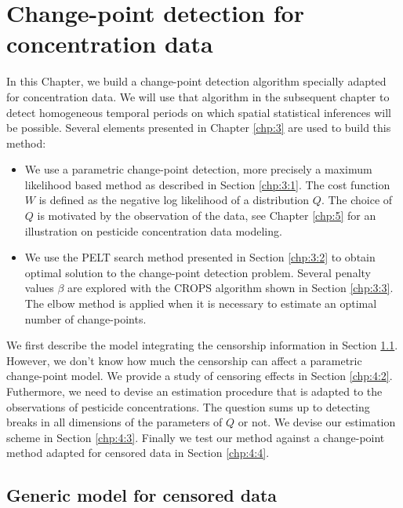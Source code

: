 \chapter{Change-point detection for concentration data}\label{chp:4}

\minitoc

\clearpage

In this Chapter, we build a change-point detection algorithm specially adapted for concentration data. We will use that algorithm in the subsequent chapter to detect homogeneous temporal periods on which spatial statistical inferences will be possible. Several elements presented in Chapter \ref{chp:3} are used to build this method:  
\begin{itemize}
\item We use a parametric change-point detection, more precisely a maximum likelihood based method as described in Section \ref{chp:3:1}. The cost function $W$ is defined as the negative log likelihood of a distribution $Q$. The choice of $Q$ is motivated by the observation of the data, see Chapter \ref{chp:5} for an illustration on pesticide concentration data modeling.  
\item We use the PELT search method presented in Section \ref{chp:3:2} to obtain optimal solution to the change-point detection problem. Several penalty values $\beta$ are explored with the CROPS algorithm shown in Section \ref{chp:3:3}. The elbow method is applied when it is necessary to estimate an optimal number of change-points.   
\end{itemize}
We first describe the model integrating the censorship information in Section \ref{chp:4:1}. However, we don't know how much the censorship can affect a parametric change-point model. We provide a study of censoring effects in Section \ref{chp:4:2}. Futhermore, we need to devise an estimation procedure that is adapted to the observations of pesticide concentrations. The question sums up to detecting breaks in all dimensions of the parameters of $Q$ or not. We devise our estimation scheme in Section \ref{chp:4:3}. Finally we test our method against a change-point method adapted for censored data in Section \ref{chp:4:4}.  


\section{Generic model for censored data}\label{chp:4:1}

